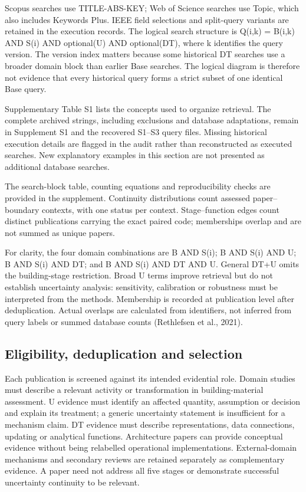 Scopus searches use TITLE-ABS-KEY; Web of Science searches use Topic, which also includes Keywords Plus. IEEE field selections and split-query variants are retained in the execution records. The logical search structure is Q(i,k) = B(i,k) AND S(i) AND optional(U) AND optional(DT), where k identifies the query version. The version index matters because some historical DT searches use a broader domain block than earlier Base searches. The logical diagram is therefore not evidence that every historical query forms a strict subset of one identical Base query.

Supplementary Table S1 lists the concepts used to organize retrieval. The complete archived strings, including exclusions and database adaptations, remain in Supplement S1 and the recovered S1–S3 query files. Missing historical execution details are flagged in the audit rather than reconstructed as executed searches. New explanatory examples in this section are not presented as additional database searches.

The search-block table, counting equations and reproducibility checks are provided in the supplement. Continuity distributions count assessed paper–boundary contexts, with one status per context. Stage–function edges count distinct publications carrying the exact paired code; memberships overlap and are not summed as unique papers.

For clarity, the four domain combinations are B AND S(i); B AND S(i) AND U; B AND S(i) AND DT; and B AND S(i) AND DT AND U. General DT+U omits the building-stage restriction. Broad U terms improve retrieval but do not establish uncertainty analysis: sensitivity, calibration or robustness must be interpreted from the methods. Membership is recorded at publication level after deduplication. Actual overlaps are calculated from identifiers, not inferred from query labels or summed database counts (Rethlefsen et al., 2021).


\subsection{Eligibility, deduplication and selection}
Each publication is screened against its intended evidential role. Domain studies must describe a relevant activity or transformation in building-material assessment. U evidence must identify an affected quantity, assumption or decision and explain its treatment; a generic uncertainty statement is insufficient for a mechanism claim. DT evidence must describe representations, data connections, updating or analytical functions. Architecture papers can provide conceptual evidence without being relabelled operational implementations. External-domain mechanisms and secondary reviews are retained separately as complementary evidence. A paper need not address all five stages or demonstrate successful uncertainty continuity to be relevant.

